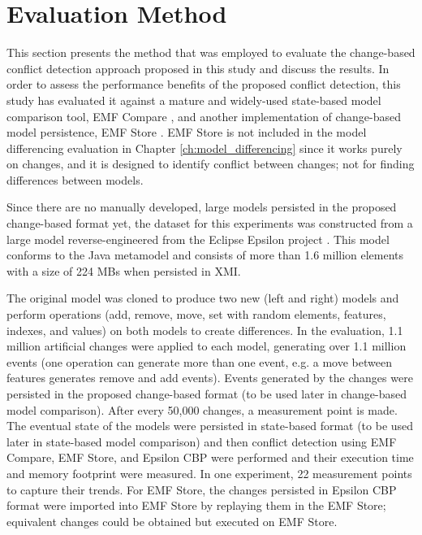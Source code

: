 \section{Evaluation Method}
\label{sec:evaluation_conflict_Detection}
This section presents the method that was employed to evaluate the change-based conflict detection approach proposed in this study and discuss the results. In order to assess the performance benefits of the proposed conflict detection, this study has evaluated it against a mature and widely-used state-based model comparison tool, EMF Compare \cite{emfcompare2018developer,eclipse2017compare}, and another implementation of change-based model persistence, EMF Store \cite{koegel2010emfstore}. EMF Store is not included in the model differencing evaluation in Chapter \ref{ch:model_differencing} since it works purely on changes, and it is designed to identify conflict between changes; not for finding differences between models. 

Since there are no manually developed, large models persisted in the proposed change-based format yet, the dataset for this experiments was constructed from a large model reverse-engineered from the Eclipse Epsilon project \cite{eclipse2018epsilongit,eclipse2017epsilon}. This model conforms to the Java metamodel \cite{eclipse2018modiscojava} and consists of more than 1.6 million elements with a size of 224 MBs when persisted in XMI. 

The original model was cloned to produce two new (left and right) models and perform operations (\textsf{add}, \textsf{remove}, \textsf{move}, \textsf{set} with random elements, features, indexes, and values) on both models to create differences. In the evaluation, 1.1 million artificial changes were applied to each model, generating over 1.1 million events (one operation can generate more than one event, e.g. a \textsf{move} between features generates \textsf{remove} and \textsf{add} events). Events generated by the changes were persisted in the proposed change-based format (to be used later in change-based model comparison). After every 50,000 changes, a measurement point is made. The eventual state of the models were persisted in state-based format (to be used later in state-based model comparison) and then conflict detection using EMF Compare, EMF Store, and Epsilon CBP were performed and their execution time and memory footprint were measured. In one experiment, 22 measurement points to capture their trends. For EMF Store, the changes persisted in Epsilon CBP format were imported into EMF Store by replaying them in the EMF Store; equivalent changes could be obtained but executed on EMF Store. 

